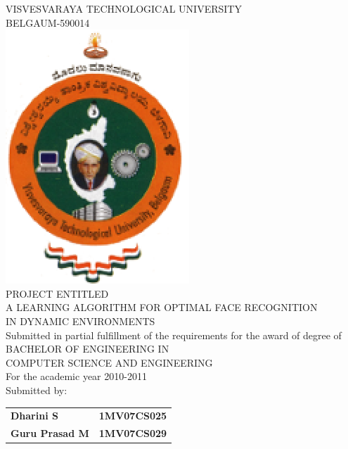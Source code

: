 \documentclass{article}
\newcommand{\tab}{\hspace*{8 cm}}
\begin{document}
\begin{center}
\thispagestyle{empty}

\large{VISVESVARAYA TECHNOLOGICAL UNIVERSITY \\ BELGAUM-590014 } \\
\vspace{1mm}
\includegraphics{mspicture.eps}
\vspace{2mm}
\\
\normalsize{PROJECT ENTITLED}\\
\vspace{2mm}
\Large{A LEARNING ALGORITHM FOR OPTIMAL FACE RECOGNITION \\ IN DYNAMIC ENVIRONMENTS}\\
\vspace{3mm}
\normalsize{Submitted in partial fulfillment of the requirements for the award of degree of \\}
\vspace{1mm}
\large{BACHELOR OF ENGINEERING IN }\\
\large{COMPUTER SCIENCE AND ENGINEERING}\\
\vspace{1mm}
\normalsize{For the academic year 2010-2011\\}
\vspace{3mm}
\large{Submitted by:} \\
\begin{table}[h]
\begin{tabular}{lr}
\normalsize\textbf{Dharini S} \tab & \textbf{1MV07CS025}   \\
\normalsize\textbf{Guru Prasad M} \tab & \textbf{1MV07CS029}   \\

\end{tabular}
\end{table}
\end{center}
\end{document}
